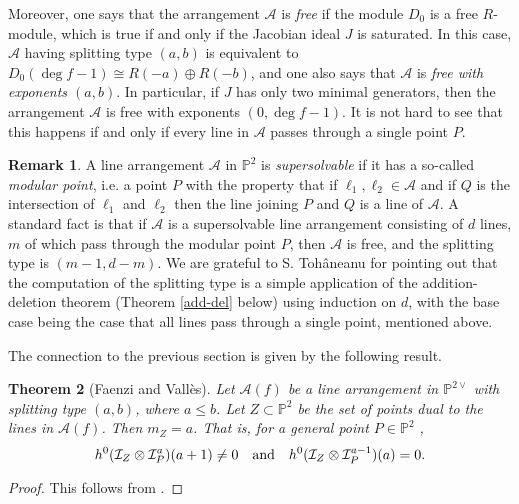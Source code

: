 \documentclass[12pt]{amsart}
\numberwithin{equation}{section}
\newtheorem{theorem}{Theorem}[section]
\theoremstyle{definition}
\newtheorem{remark}[theorem]{Remark}
\begin{document}
Moreover, one says that the arrangement  ${\mathcal{A}}$ is \emph{free} if the module $D_0$ is a free $R$-module, which is true if and only if the Jacobian ideal $ J$ is saturated. In this case, ${\mathcal{A}}$ having splitting type $(a, b)$ is equivalent to $D_0 (\deg f - 1) \cong R(-a) \oplus R(-b)$, and one also says that $\mathcal A$ is \emph{free with exponents $(a,b)$}. In particular, if $ J$ has only two minimal generators, then  the arrangement ${\mathcal{A}}$ is free with exponents $(0, \deg f -1)$.  It is not hard to see that this happens if and only if every line in ${\mathcal{A}}$ passes through a single point $P$. 

\begin{remark} \label{stefan}
A line arrangement $\mathcal A$ in $\mathbb P^2$ is {\em supersolvable} if it has a so-called {\em modular point}, i.e. a point $P$ with the property that if $\ell_1, \ell_2 \in \mathcal A$ and if $Q$ is the intersection of $\ell_1$ and $\ell_2$ then the line joining $P$ and $Q$ is a line of $\mathcal A$. A standard fact is that if $\mathcal A$ is a supersolvable line arrangement consisting of $d$ lines, $m$ of which pass through the  modular point $P$, then $\mathcal A$ is free, and the splitting type is $(m-1,d-m)$. We are grateful to S. Toh\^{a}neanu for pointing out that the computation of the splitting type is a simple application of the addition-deletion theorem (Theorem \ref{add-del} below) using induction on $d$, with  the base case being the case that all lines pass through a single point, mentioned above. 
\end{remark}

The connection to the previous section is given by the following result. 

\begin{theorem}[Faenzi and Vall\`es] 
    \label{FVstrong}
Let ${\mathcal A} (f)$ be a line arrangement in $\mathbb P^{2\vee}$ 
  with splitting type  $(a, b)$, where $a \le b$. Let 
$Z \subset { \ensuremath{\mathbb{P}}}^2$ be the set of points dual to the lines in  $\mathcal A (f)$.   Then $m_Z = a$. That is, for a general 
point $P \in \mathbb P^2$ , 
\[
h^0(\mathcal I_Z \otimes \mathcal I_P^a)(a+1) \neq 0 \ \ \hbox{ and } \ \ 
h^0(\mathcal I_Z \otimes \mathcal I_P^{a-1})(a) = 0.
\]
\end{theorem} 

\begin {proof}
This follows from \cite[Theorem 4.3]{FV2}. 
\end{proof} 
\end{document}
